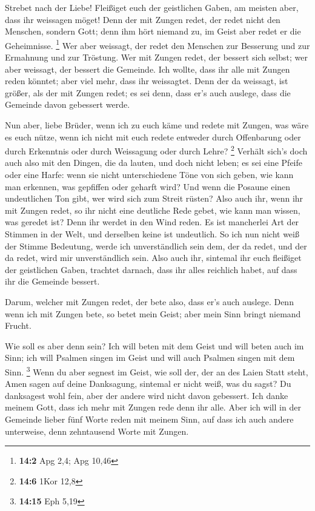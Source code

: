  Strebet nach der Liebe! Fleißiget euch der geistlichen
Gaben, am meisten aber, dass ihr weissagen möget!  Denn
der mit Zungen redet, der redet nicht den Menschen, sondern Gott; denn
ihm hört niemand zu, im Geist aber redet er die Geheimnisse. \footnote{\textbf{14:2}
  Apg 2,4; Apg 10,46}  Wer aber weissagt, der redet den
Menschen zur Besserung und zur Ermahnung und zur Tröstung.
 Wer mit Zungen redet, der bessert sich selbst; wer aber
weissagt, der bessert die Gemeinde.  Ich wollte, dass ihr
alle mit Zungen reden könntet; aber viel mehr, dass ihr weissagtet. Denn
der da weissagt, ist größer, als der mit Zungen redet; es sei denn, dass
er's auch auslege, dass die Gemeinde davon gebessert werde.

 Nun aber, liebe Brüder, wenn ich zu euch käme und redete
mit Zungen, was wäre es euch nütze, wenn ich nicht mit euch redete
entweder durch Offenbarung oder durch Erkenntnis oder durch Weissagung
oder durch Lehre? \footnote{\textbf{14:6} 1Kor 12,8} 
Verhält sich's doch auch also mit den Dingen, die da lauten, und doch
nicht leben; es sei eine Pfeife oder eine Harfe: wenn sie nicht
unterschiedene Töne von sich geben, wie kann man erkennen, was gepfiffen
oder geharft wird?  Und wenn die Posaune einen
undeutlichen Ton gibt, wer wird sich zum Streit rüsten? 
Also auch ihr, wenn ihr mit Zungen redet, so ihr nicht eine deutliche
Rede gebet, wie kann man wissen, was geredet ist? Denn ihr werdet in den
Wind reden.  Es ist mancherlei Art der Stimmen in der
Welt, und derselben keine ist undeutlich.  So ich nun
nicht weiß der Stimme Bedeutung, werde ich unverständlich sein dem, der
da redet, und der da redet, wird mir unverständlich sein.
 Also auch ihr, sintemal ihr euch fleißiget der
geistlichen Gaben, trachtet darnach, dass ihr alles reichlich habet, auf
dass ihr die Gemeinde bessert.

 Darum, welcher mit Zungen redet, der bete also, dass
er's auch auslege.  Denn wenn ich mit Zungen bete, so
betet mein Geist; aber mein Sinn bringt niemand Frucht.

 Wie soll es aber denn sein? Ich will beten mit dem Geist
und will beten auch im Sinn; ich will Psalmen singen im Geist und will
auch Psalmen singen mit dem Sinn. \footnote{\textbf{14:15} Eph 5,19}
 Wenn du aber segnest im Geist, wie soll der, der an des
Laien Statt steht, Amen sagen auf deine Danksagung, sintemal er nicht
weiß, was du sagst?  Du danksagest wohl fein, aber der
andere wird nicht davon gebessert.  Ich danke meinem
Gott, dass ich mehr mit Zungen rede denn ihr alle.  Aber
ich will in der Gemeinde lieber fünf Worte reden mit meinem Sinn, auf
dass ich auch andere unterweise, denn zehntausend Worte mit Zungen.

